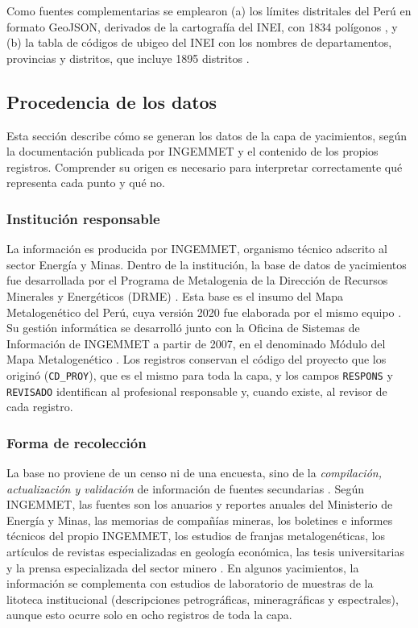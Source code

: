 \documentclass[man,12pt,a4paper,floatsintext,donotrepeattitle]{apa7}
\begin{document}
Como fuentes complementarias se emplearon (a) los límites distritales del Perú
en formato GeoJSON, derivados de la cartografía del INEI, con 1834 polígonos
\parencite{juaneladio-geojson}, y (b) la tabla de códigos de ubigeo del INEI con
los nombres de departamentos, provincias y distritos, que incluye 1895 distritos
\parencite{castagnetto-ubigeo}.

\subsection{Procedencia de los datos}

Esta sección describe cómo se generan los datos de la capa de yacimientos, según
la documentación publicada por INGEMMET y el contenido de los propios registros.
Comprender su origen es necesario para interpretar correctamente qué representa
cada punto y qué no.

\subsubsection{Institución responsable}

La información es producida por INGEMMET, organismo técnico adscrito al sector
Energía y Minas. Dentro de la institución, la base de datos de yacimientos fue
desarrollada por el Programa de Metalogenia de la Dirección de Recursos
Minerales y Energéticos (DRME) \parencite{huanacuni2010guia}. Esta base es el
insumo del Mapa Metalogenético del Perú, cuya versión 2020 fue elaborada por el
mismo equipo \parencite{acosta2020}. Su gestión informática se
desarrolló junto con la Oficina de Sistemas de Información de INGEMMET a partir
de 2007, en el denominado Módulo del Mapa Metalogenético
\parencite{huanacuni2010cpg}. Los registros conservan el código del proyecto que
los originó (\texttt{CD\_PROY}), que es el mismo para toda la capa, y los campos
\texttt{RESPONS} y \texttt{REVISADO} identifican al profesional responsable y,
cuando existe, al revisor de cada registro.

\subsubsection{Forma de recolección}

La base no proviene de un censo ni de una encuesta, sino de la
\textit{compilación, actualización y validación} de información de fuentes
secundarias \parencite{huanacuni2010cpg}. Según INGEMMET, las fuentes son los
anuarios y reportes anuales del Ministerio de Energía y Minas, las memorias de
compañías mineras, los boletines e informes técnicos del propio INGEMMET, los
estudios de franjas metalogenéticas, los artículos de revistas especializadas en
geología económica, las tesis universitarias y la prensa especializada del sector
minero \parencite{huanacuni2010guia,ingemmet2026servicio}. En algunos
yacimientos, la información se complementa con estudios de laboratorio de
muestras de la litoteca institucional (descripciones petrográficas,
mineragráficas y espectrales), aunque esto ocurre solo en ocho registros de toda
la capa.
\end{document}
